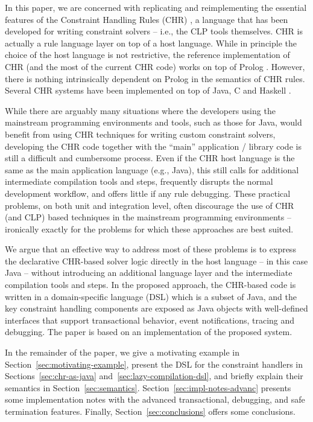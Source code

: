 \documentclass[runningheads,a4paper,11pt,dvipsname]{llncs}
\begin{document}
In this paper, we are concerned with replicating and reimplementing
the essential features of the Constraint Handling Rules (CHR)
\cite{fruehwirth09:CHR_book}, a language that has been developed for
writing constraint solvers -- i.e., the CLP tools themselves.  CHR is
actually a rule language layer on top of a host language.  While in
principle the choice of the host language is not restrictive, the
reference implementation of CHR (and the most of the current CHR code)
works on top of Prolog \cite{schrijvers2005constraint}.  However,
there is nothing intrinsically dependent on Prolog in the semantics of
CHR rules.  Several CHR systems have been implemented on top of Java,
C and Haskell \cite{kuleuven-chr-impl}.

While there are arguably many situations where the developers using
the mainstream programming environments and tools, such as those for
Java, would benefit from using CHR techniques for writing custom
constraint solvers, developing the CHR code together with the ``main''
application / library code is still a difficult and cumbersome
process.  Even if the CHR host language is the same as the main
application language (e.g., Java), this still calls for additional
intermediate compilation tools and steps, frequently disrupts the
normal development workflow, and offers little if any rule debugging.
These practical problems, on both unit and integration level, often
discourage the use of CHR (and CLP) based techniques in the mainstream
programming environments -- ironically exactly for the problems for
which these approaches are best suited.

We argue that an effective way to address most of these problems is to
express the declarative CHR-based solver logic directly in the host
language -- in this case Java -- without introducing an additional
language layer and the intermediate compilation tools and steps.  In
the proposed approach, the CHR-based code is written in a
domain-specific language (DSL) which is a subset of Java, and the key
constraint handling components are exposed as Java objects with
well-defined interfaces that support transactional behavior, event
notifications, tracing and debugging.
The paper is based on an implementation of the proposed system.

In the remainder of the paper, we give a motivating example in
Section~\ref{sec:motivating-example}, present the DSL for the
constraint handlers in Sections~\ref{sec:chr-as-java}
and~\ref{sec:lazy-compilation-dsl}, and briefly explain their
semantics in Section~\ref{sec:semantics}.
Section~\ref{sec:impl-notes-advanc} presents some implementation
notes with the advanced transactional, debugging, and safe termination
features.  Finally, Section~\ref{sec:conclusions} offers some
conclusions.
\end{document}
